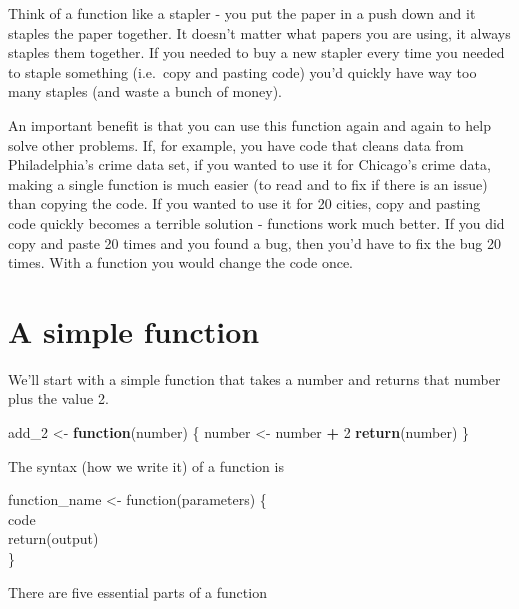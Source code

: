 \documentclass[
  12pt,
]{book}
\newenvironment{Shaded}{\begin{snugshade}}{\end{snugshade}}
\newcommand{\ControlFlowTok}[1]{\textcolor[rgb]{0.27,0.27,0.27}{\textbf{#1}}}
\newcommand{\DecValTok}[1]{\textcolor[rgb]{0.06,0.06,0.06}{#1}}
\newcommand{\KeywordTok}[1]{\textcolor[rgb]{0.27,0.27,0.27}{\textbf{#1}}}
\newcommand{\NormalTok}[1]{#1}
\newcommand{\OperatorTok}[1]{\textcolor[rgb]{0.43,0.43,0.43}{\textbf{#1}}}
\newcommand{\StringTok}[1]{\textcolor[rgb]{0.5,0.5,0.5}{#1}}
\begin{document}
Think of a function like a stapler - you put the paper in a push down and it staples the paper together. It doesn't matter what papers you are using, it always staples them together. If you needed to buy a new stapler every time you needed to staple something (i.e.~copy and pasting code) you'd quickly have way too many staples (and waste a bunch of money).

An important benefit is that you can use this function again and again to help solve other problems. If, for example, you have code that cleans data from Philadelphia's crime data set, if you wanted to use it for Chicago's crime data, making a single function is much easier (to read and to fix if there is an issue) than copying the code. If you wanted to use it for 20 cities, copy and pasting code quickly becomes a terrible solution - functions work much better. If you did copy and paste 20 times and you found a bug, then you'd have to fix the bug 20 times. With a function you would change the code once.

\hypertarget{a-simple-function}{%
\section{A simple function}\label{a-simple-function}}

We'll start with a simple function that takes a number and returns that number plus the value 2.

\begin{Shaded}
\begin{Highlighting}[]
\NormalTok{add\_}\DecValTok{2}\NormalTok{ <{-}}\StringTok{ }\ControlFlowTok{function}\NormalTok{(number) \{}
\NormalTok{  number <{-}}\StringTok{ }\NormalTok{number }\OperatorTok{+}\StringTok{ }\DecValTok{2}
  \KeywordTok{return}\NormalTok{(number)}
\NormalTok{\}}
\end{Highlighting}
\end{Shaded}

The syntax (how we write it) of a function is

function\_name \textless- function(parameters)
\{\\
code\\
return(output)\\
\}

There are five essential parts of a function
\end{document}
